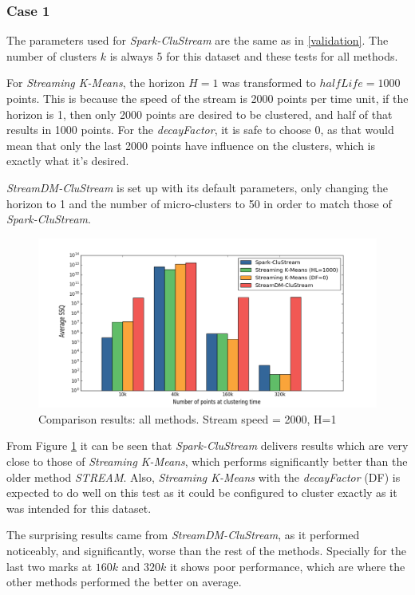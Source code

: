 \documentclass{llncs}
\begin{document}
\subsubsection{Case 1}

The parameters used for \textit{Spark-CluStream} are the same as in \ref{validation}. The number of clusters $k$ is always 5 for this dataset and these tests for all methods.

For \textit{Streaming K-Means}, the horizon $H=1$ was transformed to $halfLife=1000$ points. This is because the speed of the stream is 2000 points per time unit, if the horizon is 1, then only 2000 points are desired to be clustered, and half of that results in 1000 points. For the \textit{decayFactor}, it is safe to choose 0, as that would mean that only the last 2000 points have influence on the clusters, which is exactly what it's desired.

\textit{StreamDM-CluStream} is set up with its default parameters, only changing the horizon to 1 and the number of micro-clusters to 50 in order to match those of \textit{Spark-CluStream}.

\begin{figure}[h]
 \centering
 \includegraphics[scale=0.4]{./styles/comparison2000.png}
 \caption{Comparison results: all methods. Stream speed = 2000, H=1}
 \label{fig:comparison2000}
\end{figure}

From Figure \ref{fig:comparison2000} it can be seen that \textit{Spark-CluStream} delivers results which are very close to those of \textit{Streaming K-Means}, which performs significantly better than the older method \textit{STREAM}. Also, \textit{Streaming K-Means} with the \textit{decayFactor} (DF) is expected to do well on this test as it could be configured to cluster exactly as it was intended for this dataset. 

The surprising results came from \textit{StreamDM-CluStream}, as it performed noticeably, and significantly, worse than the rest of the methods. Specially for the last two marks at $160k$ and $320k$ it shows poor performance, which are where the other methods performed the better on average.
\end{document}
